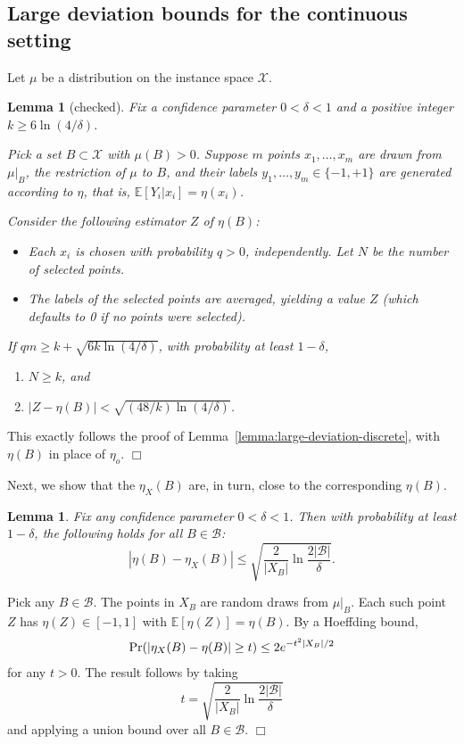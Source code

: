 \documentclass{article}
\def\pr{{\rm Pr}}
\def\E{{\mathbb E}}
\def\X{{\mathcal X}}
\def\B{{\mathcal B}}
\newtheorem{lemma}[thm]{Lemma}
\newenvironment{proof}{\noindent {\sc Proof:}}{$\Box$ \medskip}
\begin{document}
\subsection{Large deviation bounds for the continuous setting}

Let $\mu$ be a distribution on the instance space $\X$.

\begin{lemma}[checked]
Fix a confidence parameter $0 < \delta < 1$ and a positive integer $k \geq 6 \ln (4/\delta)$. 

Pick a set $B \subset \X$ with $\mu(B) > 0$. Suppose $m$ points $x_1, \ldots, x_m$ are drawn from $\mu|_B$, the restriction of $\mu$ to $B$, and their labels $y_1, \ldots, y_m \in \{-1,+1\}$ are generated according to $\eta$, that is, $\E[Y_i|x_i] = \eta(x_i)$.

Consider the following estimator $Z$ of $\eta(B)$:
\begin{itemize}
\item Each $x_i$ is chosen with probability $q > 0$, independently. Let $N$ be the number of selected points.
\item The labels of the selected points are averaged, yielding a value $Z$ (which defaults to 0 if no points were selected).
\end{itemize}
If $qm \geq k + \sqrt{6k \ln (4/\delta)}$, with probability at least $1-\delta$, 
\begin{enumerate}
\item[(a)] $N \geq k$, and 
\item[(b)] $| Z - \eta(B)| < \sqrt{(48/k) \ln (4/\delta)}$.
\end{enumerate}
\label{lemma:large-deviation-continuous}
\end{lemma}

\begin{proof}
This exactly follows the proof of Lemma~\ref{lemma:large-deviation-discrete}, with $\eta(B)$ in place of $\eta_o$.
\end{proof}

Next, we show that the $\eta_X(B)$ are, in turn, close to the corresponding $\eta(B)$.
\begin{lemma}
Fix any confidence parameter $0 < \delta < 1$. Then with probability at least $1-\delta$, the following holds for all $B \in \B$:
$$ \left| \eta(B) - \eta_X(B) \right| \leq \sqrt{\frac{2}{|X_B|} \ln \frac{2|\B|}{\delta}} .$$
\label{lemma:discrete-to-continuous}
\end{lemma}
\begin{proof}
Pick any $B \in \B$. The points in $X_B$ are random draws from $\mu|_B$. Each such point $Z$ has $\eta(Z) \in [-1,1]$ with $\E[\eta(Z)] = \eta(B)$. By a Hoeffding bound,
$$ \pr(|\eta_X(B) - \eta(B)| \geq t) \leq 2e^{-t^2|X_B|/2} $$
for any $t > 0$. The result follows by taking 
$$t = \sqrt{\frac{2}{|X_B|} \ln \frac{2|\B|}{\delta}}$$ 
and applying a union bound over all $B \in \B$.
\end{proof}
\end{document}
